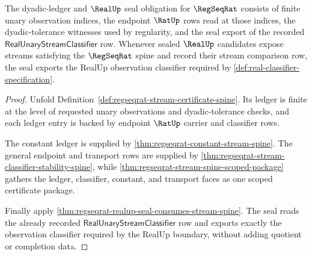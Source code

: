 \begin{theorem}
\label{thm:regseqrat-dyadic-ledger-and-real-seal-obligation}
The dyadic-ledger and $\RealUp$ seal obligation for $\RegSeqRat$ consists of
finite unary observation indices, the endpoint $\RatUp$ rows read at those
indices, the dyadic-tolerance witnesses used by regularity, and the seal export
of the recorded $\mathsf{RealUnaryStreamClassifier}$ row. Whenever sealed
$\RealUp$ candidates expose streams satisfying the $\RegSeqRat$ spine and
record their stream comparison row, the seal exports the RealUp observation
classifier required by \autoref{def:real-classifier-specification}.
\end{theorem}
\begin{proof}
Unfold Definition~\ref{def:regseqrat-stream-certificate-spine}. Its ledger is
finite at the level of requested unary observations and dyadic-tolerance
checks, and each ledger entry is backed by endpoint $\RatUp$ carrier and
classifier rows.

The constant ledger is supplied by
\autoref{thm:regseqrat-constant-stream-spine}. The general endpoint and
transport rows are supplied by
\autoref{thm:regseqrat-stream-classifier-stability-spine}, while
\autoref{thm:regseqrat-stream-spine-scoped-package} gathers the ledger,
classifier, constant, and transport faces as one scoped certificate package.

Finally apply \autoref{thm:regseqrat-realup-seal-consumes-stream-spine}. The
seal reads the already recorded
$\mathsf{RealUnaryStreamClassifier}$ row and exports exactly the observation
classifier required by the RealUp boundary, without adding quotient or
completion data.
\end{proof}

